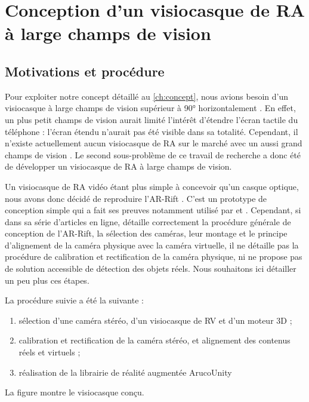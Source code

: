 \chapter{Conception d'un visiocasque de RA à large champs de vision}
\label{ch:methodology}

\section{Motivations et procédure}
Pour exploiter notre concept détaillé au \autoref{ch:concept}, nous avions besoin d'un visiocasque à large champs de vision supérieur à \ang{90} horizontalement . En effet, un plus petit champs de vision aurait limité l'intérêt d'étendre l'écran tactile du téléphone : l'écran étendu n'aurait pas été visible dans sa totalité. Cependant, il n'existe actuellement aucun visiocasque de RA sur le marché avec un aussi grand champs de vision \citep{Millette2016}. Le second sous-problème de ce travail de recherche a donc été de développer un visiocasque de RA à large champs de vision.


Un visiocasque de RA vidéo étant plus simple à concevoir qu'un casque optique, nous avons donc décidé de reproduire l'AR-Rift \citep{Steptoe2013}. C'est un prototype de conception simple qui a fait ses preuves notamment utilisé par \cite{Steptoe2014} et \cite{Piumsomboon2014}.
Cependant, si dans sa série d'articles en ligne, \citeauthor{Steptoe2013} détaille correctement la procédure générale de conception de l'AR-Rift, la sélection des caméras, leur montage et le principe d'alignement de la caméra physique avec la caméra virtuelle, il ne détaille pas la procédure de calibration et rectification de la caméra physique, ni ne propose pas de solution accessible de détection des objets réels. Nous souhaitons ici détailler un peu plus ces étapes.

La procédure suivie a été la suivante :
\begin{enumerate}
  \item sélection d'une caméra stéréo, d'un visiocasque de RV et d'un moteur 3D ;
  \item calibration et rectification de la caméra stéréo, et alignement des contenus réels et virtuels ;
  \item réalisation de la librairie de réalité augmentée ArucoUnity
\end{enumerate}
La figure  montre le visiocasque conçu.

